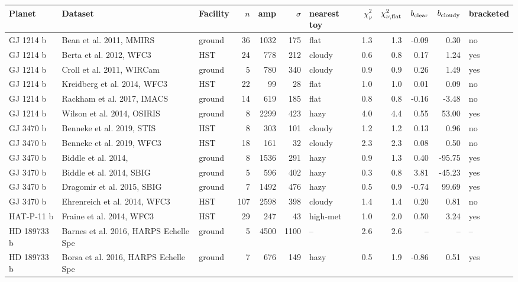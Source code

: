 \begin{table}[H]
\centering\scriptsize
\begin{tabular}{@{}lllrrrlrrrrl@{}}
\toprule
\textbf{Planet} & \textbf{Dataset} & \textbf{Facility} & \textbf{$n$} & \textbf{amp} & \textbf{$\sigma$} & \textbf{nearest toy} & \textbf{$\chi^2_\nu$} & \textbf{$\chi^2_{\nu,\rm flat}$} & \textbf{$b_{\rm clear}$} & \textbf{$b_{\rm cloudy}$} & \textbf{bracketed} \\
\midrule
GJ 1214 b & Bean et al. 2011, MMIRS & ground & 36 & 1032 & 175 & flat & 1.3 & 1.3 & -0.09 & 0.30 & no \\
GJ 1214 b & Berta et al. 2012, WFC3 & HST & 24 & 778 & 212 & cloudy & 0.6 & 0.8 & 0.17 & 1.24 & yes \\
GJ 1214 b & Croll et al. 2011, WIRCam & ground & 5 & 780 & 340 & cloudy & 0.9 & 0.9 & 0.26 & 1.49 & yes \\
GJ 1214 b & Kreidberg et al. 2014, WFC3 & HST & 22 & 99 & 28 & flat & 1.0 & 1.0 & 0.01 & 0.09 & no \\
GJ 1214 b & Rackham et al. 2017, IMACS & ground & 14 & 619 & 185 & flat & 0.8 & 0.8 & -0.16 & -3.48 & no \\
GJ 1214 b & Wilson et al. 2014, OSIRIS & ground & 8 & 2299 & 423 & hazy & 4.0 & 4.4 & 0.55 & 53.00 & yes \\
GJ 3470 b & Benneke et al. 2019, STIS & HST & 8 & 303 & 101 & cloudy & 1.2 & 1.2 & 0.13 & 0.96 & no \\
GJ 3470 b & Benneke et al. 2019, WFC3 & HST & 18 & 161 & 32 & cloudy & 2.3 & 2.3 & 0.08 & 0.50 & no \\
GJ 3470 b & Biddle et al. 2014,  & ground & 8 & 1536 & 291 & hazy & 0.9 & 1.3 & 0.40 & -95.75 & yes \\
GJ 3470 b & Biddle et al. 2014, SBIG & ground & 5 & 596 & 402 & hazy & 0.3 & 0.8 & 3.81 & -45.23 & yes \\
GJ 3470 b & Dragomir et al. 2015, SBIG & ground & 7 & 1492 & 476 & hazy & 0.5 & 0.9 & -0.74 & 99.69 & yes \\
GJ 3470 b & Ehrenreich et al. 2014, WFC3 & HST & 107 & 2598 & 398 & cloudy & 1.4 & 1.4 & 0.20 & 0.81 & no \\
HAT-P-11 b & Fraine et al. 2014, WFC3 & HST & 29 & 247 & 43 & high-met & 1.0 & 2.0 & 0.50 & 3.24 & yes \\
HD 189733 b & Barnes et al. 2016, HARPS Echelle Spe & ground & 5 & 4500 & 1100 & -- & 2.6 & 2.6 & -- & -- & -- \\
HD 189733 b & Borsa et al. 2016, HARPS Echelle Spe & ground & 7 & 676 & 149 & hazy & 0.5 & 1.9 & -0.86 & 0.51 & yes \\

\end{tabular}
\end{table}
